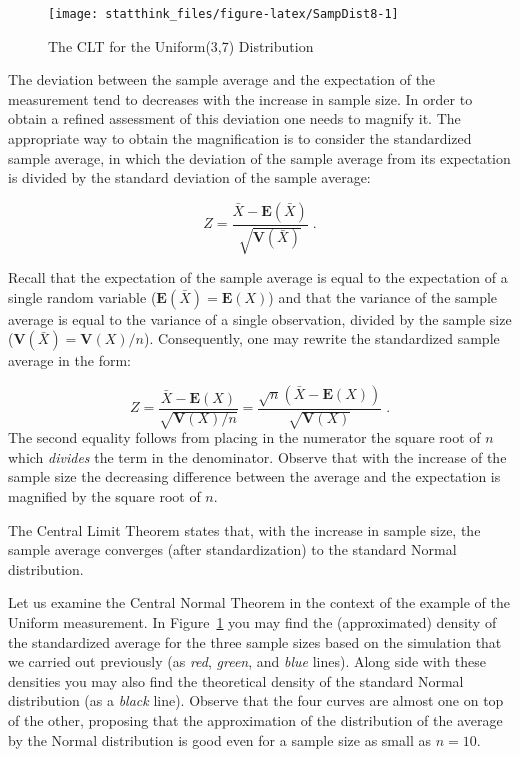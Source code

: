 \documentclass[]{krantz}
\newcommand{\Expec}{\mathbf{E}}
\newcommand{\Var}{\mathbf{V}}
\theoremstyle{definition}
\theoremstyle{definition}
\theoremstyle{definition}
\theoremstyle{remark}
\begin{document}
\begin{figure}

{\centering \texttt{[image: statthink\_files/figure-latex/SampDist8-1]} 

}

\caption{The CLT for the Uniform(3,7) Distribution}\label{fig:SampDist8}
\end{figure}

The deviation between the sample average and the expectation of the
measurement tend to decreases with the increase in sample size. In order
to obtain a refined assessment of this deviation one needs to magnify
it. The appropriate way to obtain the magnification is to consider the
standardized sample average, in which the deviation of the sample
average from its expectation is divided by the standard deviation of the
sample average:

\[Z = \frac{\bar X - \Expec(\bar X)}{\sqrt{\Var(\bar X)}}\;.\]

Recall that the expectation of the sample average is equal to the
expectation of a single random variable (\(\Expec(\bar X) = \Expec(X)\))
and that the variance of the sample average is equal to the variance of
a single observation, divided by the sample size
(\(\Var(\bar X) = \Var(X)/n\)). Consequently, one may rewrite the
standardized sample average in the form:

\[Z = \frac{\bar X - \Expec(X)}{\sqrt{\Var(X)/n}}= \frac{\sqrt{n}(\bar X - \Expec(X))}{\sqrt{\Var(X)}}\;.\]
The second equality follows from placing in the numerator the square
root of \(n\) which \emph{divides} the term in the denominator. Observe that
with the increase of the sample size the decreasing difference between
the average and the expectation is magnified by the square root of \(n\).

The Central Limit Theorem states that, with the increase in sample size,
the sample average converges (after standardization) to the standard
Normal distribution.

Let us examine the Central Normal Theorem in the context of the example
of the Uniform measurement. In Figure~\ref{fig:SampDist8} you may find
the (approximated) density of the standardized average for the three
sample sizes based on the simulation that we carried out previously (as
\emph{red}, \emph{green}, and \emph{blue} lines). Along side with these densities you
may also find the theoretical density of the standard Normal
distribution (as a \emph{black} line). Observe that the four curves are
almost one on top of the other, proposing that the approximation of the
distribution of the average by the Normal distribution is good even for
a sample size as small as \(n=10\).
\end{document}
